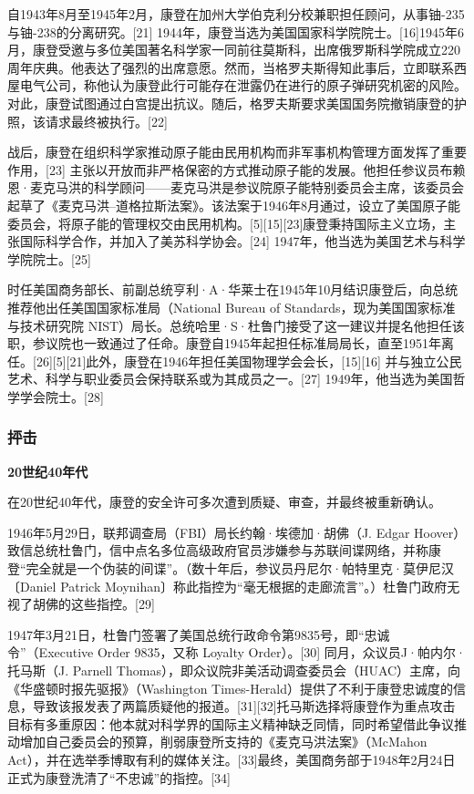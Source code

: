 自1943年8月至1945年2月，康登在加州大学伯克利分校兼职担任顾问，从事铀-235与铀-238的分离研究。[21] 1944年，康登当选为美国国家科学院院士。[16]1945年6月，康登受邀与多位美国著名科学家一同前往莫斯科，出席俄罗斯科学院成立220周年庆典。他表达了强烈的出席意愿。然而，当格罗夫斯得知此事后，立即联系西屋电气公司，称他认为康登此行可能存在泄露仍在进行的原子弹研究机密的风险。对此，康登试图通过白宫提出抗议。随后，格罗夫斯要求美国国务院撤销康登的护照，该请求最终被执行。[22]

战后，康登在组织科学家推动原子能由民用机构而非军事机构管理方面发挥了重要作用，[23] 主张以开放而非严格保密的方式推动原子能的发展。他担任参议员布赖恩·麦克马洪的科学顾问——麦克马洪是参议院原子能特别委员会主席，该委员会起草了《麦克马洪–道格拉斯法案》。该法案于1946年8月通过，设立了美国原子能委员会，将原子能的管理权交由民用机构。[5][15][23]康登秉持国际主义立场，主张国际科学合作，并加入了美苏科学协会。[24] 1947年，他当选为美国艺术与科学学院院士。[25]

时任美国商务部长、前副总统亨利·A·华莱士在1945年10月结识康登后，向总统推荐他出任美国国家标准局（National Bureau of Standards，现为美国国家标准与技术研究院 NIST）局长。总统哈里·S·杜鲁门接受了这一建议并提名他担任该职，参议院也一致通过了任命。康登自1945年起担任标准局局长，直至1951年离任。[26][5][21]此外，康登在1946年担任美国物理学会会长，[15][16] 并与独立公民艺术、科学与职业委员会保持联系或为其成员之一。[27] 1949年，他当选为美国哲学学会院士。[28]
\subsubsection{抨击}
\textbf{20世纪40年代}

在20世纪40年代，康登的安全许可多次遭到质疑、审查，并最终被重新确认。

1946年5月29日，联邦调查局（FBI）局长约翰·埃德加·胡佛（J. Edgar Hoover）致信总统杜鲁门，信中点名多位高级政府官员涉嫌参与苏联间谍网络，并称康登“完全就是一个伪装的间谍”。（数十年后，参议员丹尼尔·帕特里克·莫伊尼汉〔Daniel Patrick Moynihan〕称此指控为“毫无根据的走廊流言”。）杜鲁门政府无视了胡佛的这些指控。[29]

1947年3月21日，杜鲁门签署了美国总统行政命令第9835号，即“忠诚令”（Executive Order 9835，又称 Loyalty Order）。[30] 同月，众议员J·帕内尔·托马斯（J. Parnell Thomas），即众议院非美活动调查委员会（HUAC）主席，向《华盛顿时报先驱报》（Washington Times-Herald）提供了不利于康登忠诚度的信息，导致该报发表了两篇质疑他的报道。[31][32]托马斯选择将康登作为重点攻击目标有多重原因：他本就对科学界的国际主义精神缺乏同情，同时希望借此争议推动增加自己委员会的预算，削弱康登所支持的《麦克马洪法案》（McMahon Act），并在选举季博取有利的媒体关注。[33]最终，美国商务部于1948年2月24日正式为康登洗清了“不忠诚”的指控。[34]
